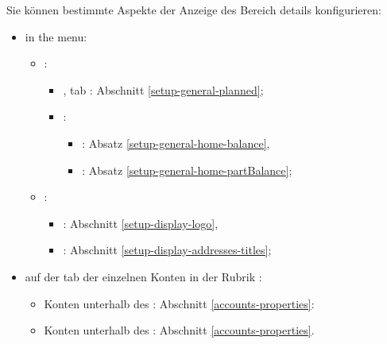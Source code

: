 Sie können bestimmte Aspekte der Anzeige des Bereich details konfigurieren:%
\begin{itemize}
	\item in the  menu: %
	\begin{itemize}
		\item {}:
		\begin{itemize}
			\item {}, tab : Abschnitt \vref{setup-general-planned};
			\item {}:
			\begin{itemize}
				\item {}: Absatz \vref{setup-general-home-balance},
				\item {}: Absatz \vref{setup-general-home-partBalance};
			\end{itemize}
		\end{itemize}
		\item {}:
		\begin{itemize}
			\item {}: Abschnitt \vref{setup-display-logo},
			\item {}: Abschnitt \vref{setup-display-addresses-titles};
		\end{itemize}
	\end{itemize}
	\item auf der tab  der einzelnen Konten in der Rubrik :%
	\begin{itemize}
		\item Konten unterhalb des : Abschnitt \vref{accounts-properties}:
		\item Konten unterhalb des : Abschnitt  \vref{accounts-properties}.
	\end{itemize}
\end{itemize}


